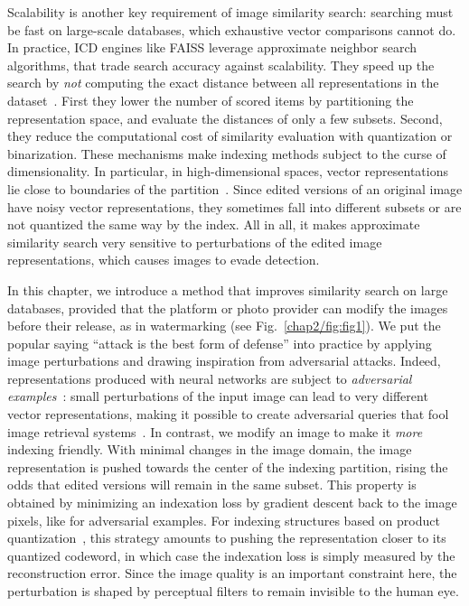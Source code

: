Scalability is another key requirement of image similarity search: searching must be fast on large-scale databases, which exhaustive vector comparisons cannot do.
In practice, ICD engines like \Gls*{FAISS} leverage approximate neighbor search algorithms, that trade search accuracy against scalability.
They speed up the search by \emph{not} computing the exact distance between all representations in the dataset~\citep{johnson2019faiss, guo2020scann}.
First they lower the number of scored items by partitioning the representation space, and evaluate the distances of only a few subsets. 
Second, they reduce the computational cost of similarity evaluation with quantization or binarization.
These mechanisms make indexing methods subject to the curse of dimensionality.
In particular, in high-dimensional spaces, vector representations lie close to boundaries of the partition~\citep{bohm2001searching}.
Since edited versions of an original image have noisy vector representations, they sometimes fall into different subsets or are not quantized the same way by the index. 
All in all, it makes approximate similarity search very sensitive to perturbations of the edited image representations, which causes images to evade detection.

In this chapter, we introduce a method that improves similarity search on large databases, provided that the platform or photo provider can modify the images before their release, as in watermarking (see Fig.~\ref{chap2/fig:fig1}). 
We put the popular saying ``attack is the best form of defense'' into practice by applying image perturbations and drawing inspiration from adversarial attacks. 
Indeed, representations produced with neural networks are subject to \emph{adversarial examples}~\citep{szegedy2013intriguing}:
small perturbations of the input image can lead to very different vector representations, making it possible to 
create adversarial queries that fool image retrieval systems~\citep{liu2019whos, tolias2019targeted,dolhansky2020adversarial}.
In contrast, we modify an image to make it \emph{more} indexing friendly.  
With minimal changes in the image domain, the image representation is pushed towards the center of the indexing partition, rising the odds that edited versions will remain in the same subset. 
This property is obtained by minimizing an indexation loss by gradient descent back to the image pixels, like for adversarial examples.
For indexing structures based on product quantization~\citep{jegou2010pq}, this strategy amounts to pushing the representation closer to its quantized codeword, in which case the indexation loss is simply measured by the reconstruction error.
Since the image quality is an important constraint here, the perturbation is shaped by perceptual filters to remain invisible to the human eye. 

